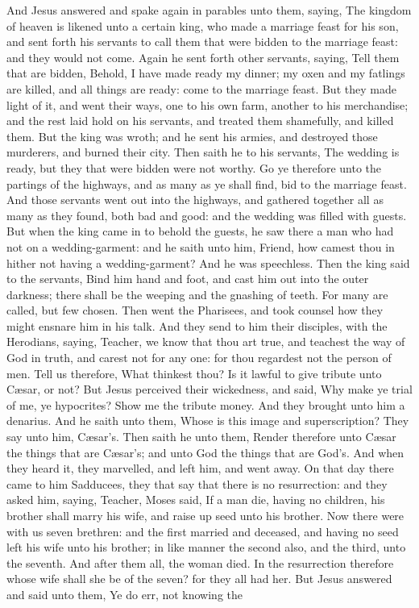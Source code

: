 And Jesus answered and spake again in parables unto them, saying, The kingdom of heaven is likened unto a certain king, who made a marriage feast for his son, and sent forth his servants to call them that were bidden to the marriage feast: and they would not come. Again he sent forth other servants, saying, Tell them that are bidden, Behold, I have made ready my dinner; my oxen and my fatlings are killed, and all things are ready: come to the marriage feast. But they made light of it, and went their ways, one to his own farm, another to his merchandise; and the rest laid hold on his servants, and treated them shamefully, and killed them. But the king was wroth; and he sent his armies, and destroyed those murderers, and burned their city. Then saith he to his servants, The wedding is ready, but they that were bidden were not worthy. Go ye therefore unto the partings of the highways, and as many as ye shall find, bid to the marriage feast. And those servants went out into the highways, and gathered together all as many as they found, both bad and good: and the wedding was filled with guests. But when the king came in to behold the guests, he saw there a man who had not on a wedding-garment: and he saith unto him, Friend, how camest thou in hither not having a wedding-garment? And he was speechless. Then the king said to the servants, Bind him hand and foot, and cast him out into the outer darkness; there shall be the weeping and the gnashing of teeth. For many are called, but few chosen.  Then went the Pharisees, and took counsel how they might ensnare him in his talk. And they send to him their disciples, with the Herodians, saying, Teacher, we know that thou art true, and teachest the way of God in truth, and carest not for any one: for thou regardest not the person of men. Tell us therefore, What thinkest thou? Is it lawful to give tribute unto Cæsar, or not? But Jesus perceived their wickedness, and said, Why make ye trial of me, ye hypocrites? Show me the tribute money. And they brought unto him a denarius. And he saith unto them, Whose is this image and superscription? They say unto him, Cæsar’s. Then saith he unto them, Render therefore unto Cæsar the things that are Cæsar’s; and unto God the things that are God’s. And when they heard it, they marvelled, and left him, and went away.  On that day there came to him Sadducees, they that say that there is no resurrection: and they asked him, saying, Teacher, Moses said, If a man die, having no children, his brother shall marry his wife, and raise up seed unto his brother. Now there were with us seven brethren: and the first married and deceased, and having no seed left his wife unto his brother; in like manner the second also, and the third, unto the seventh. And after them all, the woman died. In the resurrection therefore whose wife shall she be of the seven? for they all had her. But Jesus answered and said unto them, Ye do err, not knowing the 